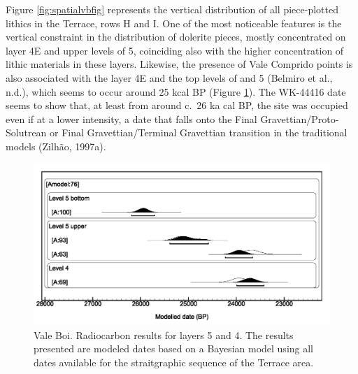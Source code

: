 \documentclass[12pt,twoside]{reedthesis}
\begin{document}
Figure \ref{fig:spatialvbfig} represents the vertical distribution of all piece-plotted lithics in the Terrace, rows H and I. One of the most noticeable features is the vertical constraint in the distribution of dolerite pieces, mostly concentrated on layer 4E and upper levels of 5, coinciding also with the higher concentration of lithic materials in these layers. Likewise, the presence of Vale Comprido points is also associated with the layer 4E and the top levels of and 5 (Belmiro et al., n.d.), which seems to occur around 25 kcal BP (Figure \ref{fig:c14VB}). The WK-44416 date seems to show that, at least from around c.~26 ka cal BP, the site was occupied even if at a lower intensity, a date that falls onto the Final Gravettian/Proto-Solutrean or Final Gravettian/Terminal Gravettian transition in the traditional models (Zilhão, 1997a).
\begin{figure}

{\centering \includegraphics[width=0.6\linewidth]{figure/c14_VB} 

}

\caption{Vale Boi. Radiocarbon results for layers 5 and 4. The results presented are modeled dates based on a Bayesian model using all dates available for the straitgraphic sequence of the Terrace area.}\label{fig:c14VB}
\end{figure}
~

~
\end{document}
